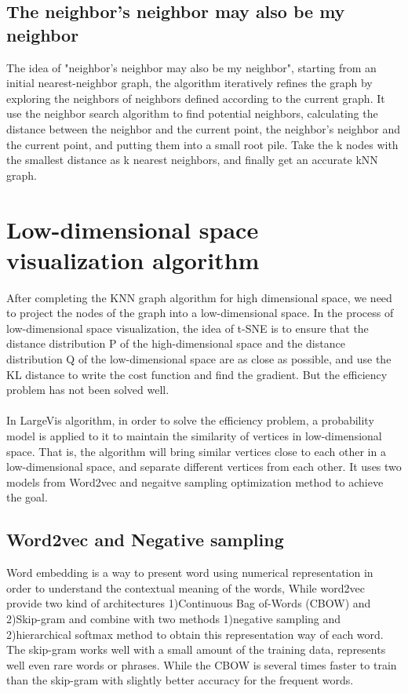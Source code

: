 \subsection{The neighbor’s neighbor may also be my neighbor}

The idea of "neighbor's neighbor may also be my neighbor", starting from an initial nearest-neighbor graph, the algorithm iteratively refines the graph by exploring the neighbors of neighbors defined according to the current graph\cite{ref5}. It use the neighbor search algorithm to find potential neighbors, calculating the distance between the neighbor and the current point, the neighbor's neighbor and the current point, and putting them into a small root pile. Take the k nodes with the smallest distance as k nearest neighbors, and finally get an accurate kNN graph.\\

\section{Low-dimensional space visualization algorithm}

\noindent After completing the KNN graph algorithm for high dimensional space, we need to project the nodes of the graph into a low-dimensional space. In the process of low-dimensional space visualization, the idea of t-SNE is to ensure that the distance distribution P of the high-dimensional space and the distance distribution Q of the low-dimensional space are as close as possible, and use the KL distance to write the cost function and find the gradient. But the efficiency problem has not been solved well.\\
\\

\noindent In LargeVis algorithm, in order to solve the efficiency problem, a probability model is applied to it to maintain the similarity of vertices in low-dimensional space. That is, the algorithm will bring similar vertices close to each other in a low-dimensional space, and separate different vertices from each other. It uses two models from Word2vec and negaitve sampling optimization method to achieve the goal.

\subsection{Word2vec and Negative sampling}
Word embedding is a way to present word using numerical representation in order to understand the contextual meaning of the words, While word2vec provide two kind of architectures 1)Continuous Bag of-Words (CBOW) and 2)Skip-gram and combine with two methods 1)negative sampling and 2)hierarchical softmax method to obtain this representation way of each word. The skip-gram works well with a small amount of the training data, represents well even rare words or phrases. While the CBOW is several times faster to train than the skip-gram with slightly better accuracy for the frequent words.


